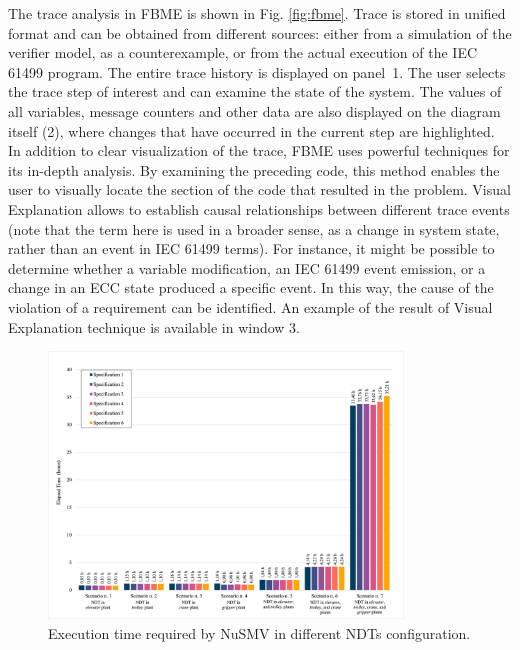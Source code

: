 \begin{bibunit}
\noindent The trace analysis in FBME is shown in Fig. \ref{fig:fbme}. Trace is stored in unified format \cite{liakh2022formal} and can be obtained from different sources: either from a simulation of the verifier model, as a counterexample, or from the actual execution of the IEC 61499 program. The entire trace history is displayed on \mbox{panel 1}. The user selects the trace step of interest and can examine the state of the system. The values of all variables, message counters and other data are also displayed on the diagram itself (2), where changes that have occurred in the current step are highlighted. 
In addition to clear visualization of the trace, FBME uses powerful techniques for its in-depth analysis. 
By examining the preceding code, this method enables the user to visually locate the section of the code that resulted in the problem. 
Visual Explanation allows to establish causal relationships between different trace events (note that the term   here is used in a broader sense, as a change in system state, rather than an event in IEC 61499 terms). For instance, it might be possible to determine whether a variable modification, an IEC 61499 event emission, or a change in an ECC state produced a specific event. 
In this way, the cause of the violation of a requirement can be identified. An example of the result of Visual Explanation technique is available in window 3.

\begin{figure}
    \centering
    \includegraphics[width=0.84\textwidth]{MX_Papers/Paper4/pictures/lilli12.eps}
    \caption{Execution time required by NuSMV in different NDTs configuration.} 
    \label{fig:graph}
\end{figure}


\end{bibunit}
